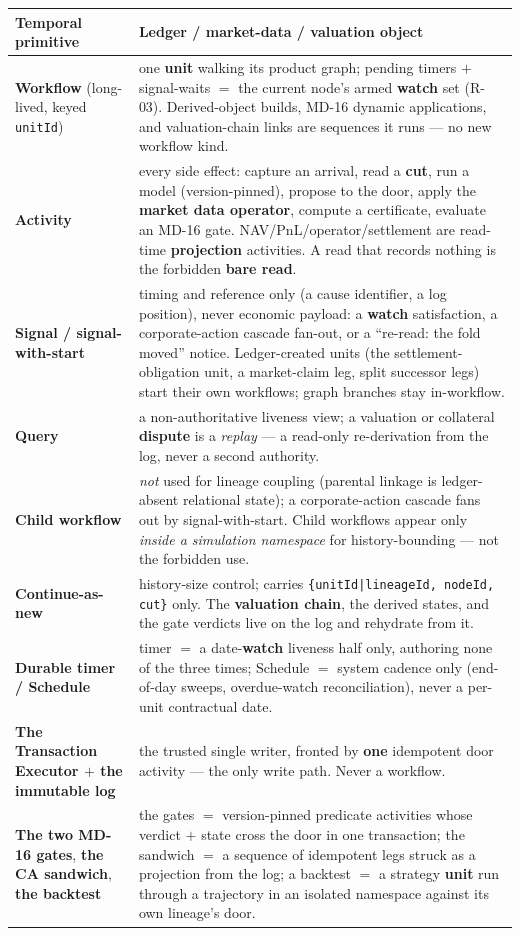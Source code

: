 \documentclass[11pt,a4paper]{article}
\begin{document}
{\footnotesize
\renewcommand{\arraystretch}{1.0}
\setlength{\tabcolsep}{3pt}
\begin{longtable}{@{}p{} p{}@{}}
\toprule
\textbf{Temporal primitive} & \textbf{Ledger / market-data / valuation object} \\
\midrule
\endhead
\textbf{Workflow} (long-lived, keyed \texttt{unitId}) & one \textbf{unit} walking its product
graph; pending timers $+$ signal-waits $=$ the current node's armed \textbf{watch} set (R-03).
Derived-object builds, MD-16 dynamic applications, and valuation-chain links are sequences it
runs --- no new workflow kind. \\
\textbf{Activity} & every side effect: capture an arrival, read a \textbf{cut}, run a model
(version-pinned), propose to the door, apply the \textbf{market data operator}, compute a
certificate, evaluate an MD-16 gate. NAV/PnL/operator/settlement are read-time \textbf{projection}
activities. A read that records nothing is the forbidden \textbf{bare read}. \\
\textbf{Signal / signal-with-start} & timing and reference only (a cause identifier, a log
position), never economic payload: a \textbf{watch} satisfaction, a corporate-action cascade
fan-out, or a ``re-read: the fold moved'' notice. Ledger-created units (the settlement-obligation
unit, a market-claim leg, split successor legs) start their own workflows; graph branches stay
in-workflow. \\
\textbf{Query} & a non-authoritative liveness view; a valuation or collateral \textbf{dispute} is
a \emph{replay} --- a read-only re-derivation from the log, never a second authority. \\
\textbf{Child workflow} & \emph{not} used for lineage coupling (parental linkage is ledger-absent
relational state); a corporate-action cascade fans out by signal-with-start. Child workflows
appear only \emph{inside a simulation namespace} for history-bounding --- not the forbidden use. \\
\textbf{Continue-as-new} & history-size control; carries \texttt{\{unitId|lineageId, nodeId, cut\}}
only. The \textbf{valuation chain}, the derived states, and the gate verdicts live on the log and
rehydrate from it. \\
\textbf{Durable timer / Schedule} & timer $=$ a date-\textbf{watch} liveness half only, authoring
none of the three times; Schedule $=$ system cadence only (end-of-day sweeps, overdue-watch
reconciliation), never a per-unit contractual date. \\
\textbf{The Transaction Executor $+$ the immutable log} & the trusted single writer, fronted by
\textbf{one} idempotent door activity --- the only write path. Never a workflow. \\
\textbf{The two MD-16 gates}, \textbf{the CA sandwich}, \textbf{the backtest} & the gates $=$
version-pinned predicate activities whose verdict $+$ state cross the door in one transaction; the
sandwich $=$ a sequence of idempotent legs struck as a projection from the log; a backtest $=$ a
strategy \textbf{unit} run through a trajectory in an isolated namespace against its own lineage's
door. \\
\bottomrule
\end{longtable}}
\end{document}
